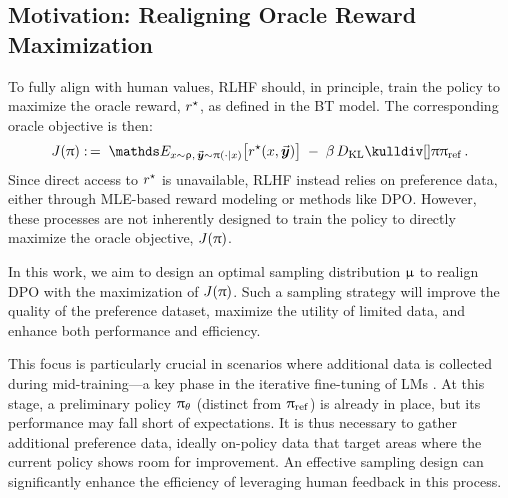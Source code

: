 	
	
	\subsection{Motivation: Realigning Oracle Reward Maximization}
	\label{sec:intro_goal}

    To fully align with human values, RLHF should, in principle, train the policy to maximize the oracle reward, $r^{\star}$, as defined in the BT model. The corresponding oracle objective is then: 
    \begin{equation} 
		\scalarvalue(\policy) \defn \; \Exp_{\prompt \sim \promptdistr, \, \response \sim \policy(\cdot \mid \prompt)} \big[ \rewardstar(\context, \response) \big] \notag \; - \; \parabeta \, \kull{\policy}{\policyref} \, .
        \label{eq:objective}
	\end{equation}
    Since direct access to $r^{\star}$ is unavailable, RLHF instead relies on preference data, either through MLE-based reward modeling or methods like DPO. 
    However, these processes are not inherently designed to train the policy to directly maximize the oracle objective, $J(\uppi)$.%
    
    In this work, we aim to design an optimal sampling distribution $\upmu$ to realign DPO with the maximization of $J(\uppi)$. Such a sampling strategy will improve the quality of the preference dataset, maximize the utility of limited data, and enhance both performance and efficiency.

    This focus is particularly crucial in scenarios where additional data is collected during mid-training—a key phase in the iterative fine-tuning of LMs
    \citep{touvron2023llama,bai2022training, xiong2024iterative, guo2024direct}.
    At this stage, a preliminary policy $\uppi_{\theta}$ (distinct from $\uppi_{{\rm ref}}$) is already in place, but its performance may fall short of expectations. It is thus necessary to gather additional preference data, ideally on-policy data that target areas where the current policy shows room for improvement. An effective sampling design can significantly enhance the efficiency of leveraging human feedback in this process.
    

